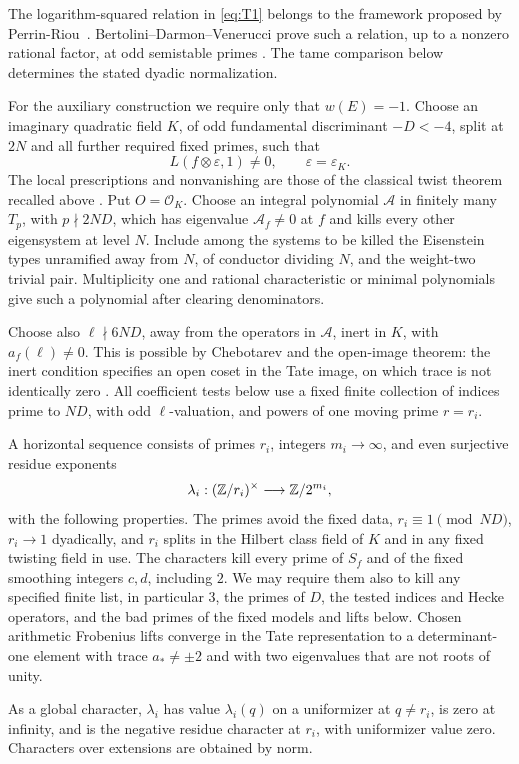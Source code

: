 The logarithm-squared relation in \eqref{eq:T1} belongs to the framework
proposed by Perrin-Riou~\cite[Section~3.3]{PerrinRiou1993}.
Bertolini--Darmon--Venerucci prove such a relation, up to a nonzero
rational factor, at odd semistable primes
\cite[Theorem~A]{BertoliniDarmonVenerucci2022}. The tame comparison
below determines the stated dyadic normalization.

For the auxiliary construction we require only that \(w(E)=-1\).
Choose an imaginary quadratic field \(K\), of odd fundamental discriminant
\(-D<-4\), split at \(2N\) and all further required fixed primes, such that
\[
 L(f\otimes\varepsilon,1)\ne0,\qquad \varepsilon=\varepsilon_K.
\]
The local prescriptions and nonvanishing are those of the classical
twist theorem recalled above \cite{FH95}. Put \(O=\mathcal O_K\).
Choose an integral polynomial \(\mathcal A\) in finitely many \(T_p\),
with \(p\nmid2ND\), which has eigenvalue \(\mathcal A_f\ne0\) at \(f\)
and kills every other eigensystem at level \(N\). Include among the systems
to be killed the Eisenstein types unramified away from \(N\), of conductor
dividing \(N\), and the weight-two trivial pair. Multiplicity one and
rational characteristic or minimal polynomials give such a polynomial
after clearing denominators.

Choose also \(\ell\nmid6ND\), away from the operators in \(\mathcal A\),
inert in \(K\), with \(a_f(\ell)\ne0\). This is possible by
Chebotarev and the open-image theorem: the inert condition specifies
an open coset in the Tate image, on which trace is not identically zero
\cite{Serre72}. All coefficient tests below use a fixed finite collection
of indices prime to \(ND\), with odd \(\ell\)-valuation, and powers of
one moving prime \(r=r_i\).

\begin{definition}\label{tame:data}
A horizontal sequence consists of primes \(r_i\), integers \(m_i\to\infty\),
and even surjective residue exponents
\[
 \lambda_i:(\mathbb Z/r_i)^\times\longrightarrow\mathbb Z/2^{m_i},
\]
with the following properties. The primes avoid the fixed data,
\(r_i\equiv1\pmod{ND}\), \(r_i\to1\) dyadically, and \(r_i\) splits in
the Hilbert class field of \(K\) and in any fixed twisting field in use.
The characters kill every prime of \(S_f\) and of the fixed smoothing
integers \(c,d\), including \(2\). We may require them also to kill any
specified finite list, in particular \(3\), the primes of \(D\), the
tested indices and Hecke operators, and the bad primes of the fixed
models and lifts below. Chosen arithmetic Frobenius lifts converge in
the Tate representation to a determinant-one element with trace
\(a_*\ne\pm2\) and with two eigenvalues that are not roots of unity.

As a global character, \(\lambda_i\) has value \(\lambda_i(q)\) on a
uniformizer at \(q\ne r_i\), is zero at infinity, and is the negative
residue character at \(r_i\), with uniformizer value zero. Characters
over extensions are obtained by norm.
\end{definition}

